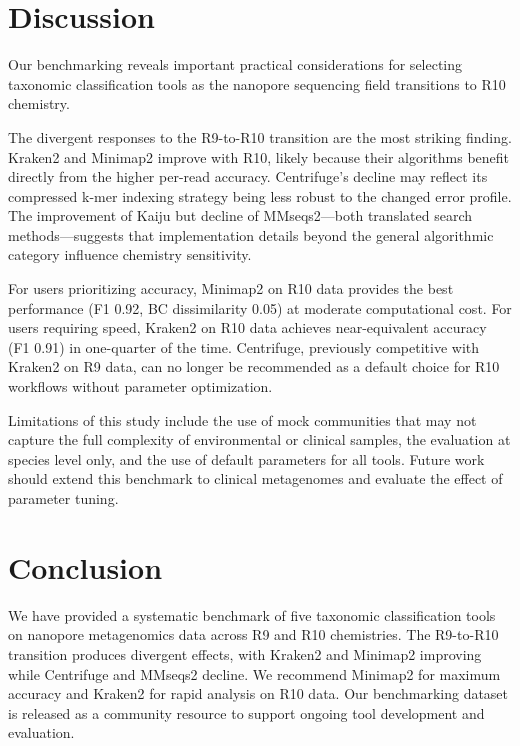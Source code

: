 \documentclass[11pt]{article}
\begin{document}
\section{Discussion}

Our benchmarking reveals important practical considerations for selecting taxonomic classification tools as the nanopore sequencing field transitions to R10 chemistry.

The divergent responses to the R9-to-R10 transition are the most striking finding. Kraken2 and Minimap2 improve with R10, likely because their algorithms benefit directly from the higher per-read accuracy. Centrifuge's decline may reflect its compressed k-mer indexing strategy being less robust to the changed error profile. The improvement of Kaiju but decline of MMseqs2---both translated search methods---suggests that implementation details beyond the general algorithmic category influence chemistry sensitivity.

For users prioritizing accuracy, Minimap2 on R10 data provides the best performance (F1 0.92, BC dissimilarity 0.05) at moderate computational cost. For users requiring speed, Kraken2 on R10 data achieves near-equivalent accuracy (F1 0.91) in one-quarter of the time. Centrifuge, previously competitive with Kraken2 on R9 data, can no longer be recommended as a default choice for R10 workflows without parameter optimization.

Limitations of this study include the use of mock communities that may not capture the full complexity of environmental or clinical samples, the evaluation at species level only, and the use of default parameters for all tools. Future work should extend this benchmark to clinical metagenomes and evaluate the effect of parameter tuning.

\section{Conclusion}

We have provided a systematic benchmark of five taxonomic classification tools on nanopore metagenomics data across R9 and R10 chemistries. The R9-to-R10 transition produces divergent effects, with Kraken2 and Minimap2 improving while Centrifuge and MMseqs2 decline. We recommend Minimap2 for maximum accuracy and Kraken2 for rapid analysis on R10 data. Our benchmarking dataset is released as a community resource to support ongoing tool development and evaluation.



\end{document}
